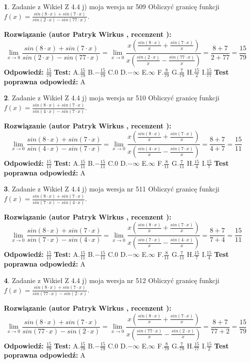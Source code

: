 \documentclass[12pt, a4paper]{article}
\theoremstyle{definition} %
\newtheorem{zad}{}
\newcommand{\zadStart}[1]{\begin{zad}#1\newline}
\newcommand{\zadStop}{\end{zad}}
\newcommand{\rozwStart}[2]{\noindent \textbf{Rozwiązanie (autor #1 , recenzent #2): }\newline}
\newcommand{\rozwStop}{\newline}
\newcommand{\odpStart}{\noindent \textbf{Odpowiedź:}\newline}
\newcommand{\odpStop}{\newline}
\newcommand{\testStart}{\noindent \textbf{Test:}\newline}
\newcommand{\testStop}{\newline}
\newcommand{\kluczStart}{\noindent \textbf{Test poprawna odpowiedź:}\newline}
\newcommand{\kluczStop}{\newline}
\begin{document}
\zadStart{Zadanie z Wikieł Z 4.4 j) moja wersja nr 509}
Obliczyć granicę funkcji $f(x)=\frac{sin(8\cdot x) +sin(7\cdot x)}{sin(2\cdot x) -sin(77\cdot x)}$.
\zadStop
\rozwStart{Patryk Wirkus}{}
$$\lim\limits_{x\to 0}\frac{sin(8\cdot x) +sin(7\cdot x)}{sin(2\cdot x) -sin(77\cdot x)}=\lim\limits_{x\to 0}\frac{x(\frac{sin(8\cdot x)}{x}+\frac{sin(7\cdot x)}{x})}{x(\frac{sin(2\cdot x)}{x}-\frac{sin(77\cdot x)}{x})}=\frac{8+7}{2+77} = \frac{15}{79}$$
\rozwStop
\odpStart
$\frac{15}{79}$
\odpStop
\testStart
A.$\frac{15}{79}$
B.$-\frac{15}{79}$
C.$0$
D.$-\infty$
E.$\infty$
F.$\frac{8}{79}$
G.$\frac{7}{79}$
H.$\frac{15}{2}$
I.$\frac{15}{77}$
\testStop
\kluczStart
A
\kluczStop



\zadStart{Zadanie z Wikieł Z 4.4 j) moja wersja nr 510}
Obliczyć granicę funkcji $f(x)=\frac{sin(8\cdot x) +sin(7\cdot x)}{sin(4\cdot x) -sin(7\cdot x)}$.
\zadStop
\rozwStart{Patryk Wirkus}{}
$$\lim\limits_{x\to 0}\frac{sin(8\cdot x) +sin(7\cdot x)}{sin(4\cdot x) -sin(7\cdot x)}=\lim\limits_{x\to 0}\frac{x(\frac{sin(8\cdot x)}{x}+\frac{sin(7\cdot x)}{x})}{x(\frac{sin(4\cdot x)}{x}-\frac{sin(7\cdot x)}{x})}=\frac{8+7}{4+7} = \frac{15}{11}$$
\rozwStop
\odpStart
$\frac{15}{11}$
\odpStop
\testStart
A.$\frac{15}{11}$
B.$-\frac{15}{11}$
C.$0$
D.$-\infty$
E.$\infty$
F.$\frac{8}{11}$
G.$\frac{7}{11}$
H.$\frac{15}{4}$
I.$\frac{15}{7}$
\testStop
\kluczStart
A
\kluczStop



\zadStart{Zadanie z Wikieł Z 4.4 j) moja wersja nr 511}
Obliczyć granicę funkcji $f(x)=\frac{sin(8\cdot x) +sin(7\cdot x)}{sin(7\cdot x) -sin(4\cdot x)}$.
\zadStop
\rozwStart{Patryk Wirkus}{}
$$\lim\limits_{x\to 0}\frac{sin(8\cdot x) +sin(7\cdot x)}{sin(7\cdot x) -sin(4\cdot x)}=\lim\limits_{x\to 0}\frac{x(\frac{sin(8\cdot x)}{x}+\frac{sin(7\cdot x)}{x})}{x(\frac{sin(7\cdot x)}{x}-\frac{sin(4\cdot x)}{x})}=\frac{8+7}{7+4} = \frac{15}{11}$$
\rozwStop
\odpStart
$\frac{15}{11}$
\odpStop
\testStart
A.$\frac{15}{11}$
B.$-\frac{15}{11}$
C.$0$
D.$-\infty$
E.$\infty$
F.$\frac{8}{11}$
G.$\frac{7}{11}$
H.$\frac{15}{7}$
I.$\frac{15}{4}$
\testStop
\kluczStart
A
\kluczStop



\zadStart{Zadanie z Wikieł Z 4.4 j) moja wersja nr 512}
Obliczyć granicę funkcji $f(x)=\frac{sin(8\cdot x) +sin(7\cdot x)}{sin(77\cdot x) -sin(2\cdot x)}$.
\zadStop
\rozwStart{Patryk Wirkus}{}
$$\lim\limits_{x\to 0}\frac{sin(8\cdot x) +sin(7\cdot x)}{sin(77\cdot x) -sin(2\cdot x)}=\lim\limits_{x\to 0}\frac{x(\frac{sin(8\cdot x)}{x}+\frac{sin(7\cdot x)}{x})}{x(\frac{sin(77\cdot x)}{x}-\frac{sin(2\cdot x)}{x})}=\frac{8+7}{77+2} = \frac{15}{79}$$
\rozwStop
\odpStart
$\frac{15}{79}$
\odpStop
\testStart
A.$\frac{15}{79}$
B.$-\frac{15}{79}$
C.$0$
D.$-\infty$
E.$\infty$
F.$\frac{8}{79}$
G.$\frac{7}{79}$
H.$\frac{15}{77}$
I.$\frac{15}{2}$
\testStop
\kluczStart
A
\kluczStop
\end{document}
